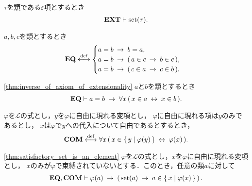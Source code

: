 	\begin{screen}
		\begin{thm}
			$\tau$を類である$\varepsilon$項とするとき
			\begin{align}
				\mbox{{\bf EXT}} \vdash \operatorname*{set} (\tau).
			\end{align}
		\end{thm}
	\end{screen}
	
	\begin{screen}
		\begin{axm}[相等性公理]
			$a,b,c$を類とするとき
			\begin{align}
				\mbox{{\bf EQ}} \overset{\mathrm{def}}{\longleftrightarrow}
				\begin{cases}
					a = b \hspace{0.25em}\rightarrow\hspace{0.25em} b = a, & \\
					a = b \hspace{0.25em}\rightarrow\hspace{0.25em} (\, a \in c \hspace{0.25em}\rightarrow\hspace{0.25em} b \in c\, ), & \\
					a = b \hspace{0.25em}\rightarrow\hspace{0.25em} (\, c \in a \hspace{0.25em}\rightarrow\hspace{0.25em} c \in b\, ). & 
				\end{cases}
			\end{align}
		\end{axm}
	\end{screen}
	
	\begin{screen}
		\begin{thm}[外延性の公理の逆も成り立つ]
		\ref{thm:inverse_of_axiom_of_extensionality}
			$a$と$b$を類とするとき
			\begin{align}
				\mbox{{\bf EQ}} \vdash 
				a = b \hspace{0.25em}\rightarrow\hspace{0.25em} \forall x\, (\, x \in a  \hspace{0.25em}\leftrightarrow\hspace{0.25em} x \in b\, ).
			\end{align}
		\end{thm}
	\end{screen}
	
	\begin{screen}
		\begin{axm}[内包性公理] 
			$\varphi$を$\mathcal{L}$の式とし，$y$を$\varphi$に自由に現れる変項とし，
			$\varphi$に自由に現れる項は$y$のみであるとし，
			$x$は$\varphi$で$y$への代入について自由であるとするとき，
			\begin{align}
				\mbox{\bf COM} \overset{\mathrm{def}}{\longleftrightarrow} \forall x\, (\, x \in \left\{\, y \mid \varphi(y)\, \right\} \hspace{0.25em}\leftrightarrow\hspace{0.25em} \varphi(x)\, ).
			\end{align}
		\end{axm}
	\end{screen}
	
	\begin{screen}
		\begin{thm}[条件を満たす集合は要素である]\ref{thm:satisfactory_set_is_an_element}
			$\varphi$を$\mathcal{L}$の式とし，$x$を$\varphi$に自由に現れる変項とし，
			$x$のみが$\varphi$で束縛されていないとする．このとき，任意の類$a$に対して
			\begin{align}
				\mbox{{\bf EQ}},\mbox{\bf COM} \vdash \varphi(a) \hspace{0.25em}\rightarrow\hspace{0.25em} 
				\left(\, \operatorname*{set} (a) \hspace{0.25em}\rightarrow\hspace{0.25em} a \in \left\{\, x \mid \varphi(x)\, \right\}\, \right).
			\end{align}
		\end{thm}
	\end{screen}
	
